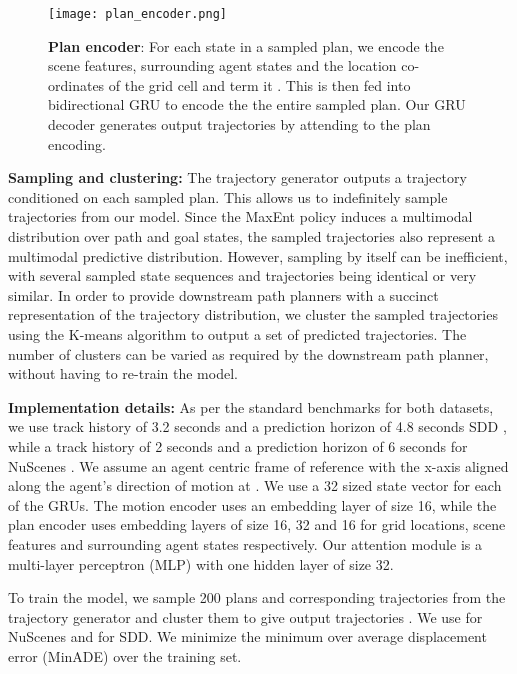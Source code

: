 \documentclass[journal]{IEEEtran}
\begin{document}
\begin{figure}[t]
\centering
\texttt{[image: plan\_encoder.png]}
\caption{\textbf{Plan encoder}: For each state in a sampled plan, we encode the scene features, surrounding agent states and the location co-ordinates of the grid cell and term it . This is then fed into bidirectional GRU to encode the the entire sampled plan. Our GRU decoder generates output trajectories by attending to the plan encoding.}
\label{fig:plan_encoder}
\end{figure}

\vspace{0.1in}
\noindent \textbf{Sampling and clustering:} The trajectory generator outputs a trajectory conditioned on each sampled plan. This allows us to indefinitely sample trajectories from our model. Since the MaxEnt policy induces a multimodal distribution over path and goal states, the sampled trajectories also represent a multimodal predictive distribution. However, sampling by itself can be inefficient, with several sampled state sequences and trajectories being identical or very similar. In order to provide downstream path planners with a succinct representation of the trajectory distribution, we cluster the sampled trajectories using the K-means algorithm to output a set of  predicted trajectories. The number of clusters  can be varied as required by the downstream path planner, without having to re-train the model.   



\vspace{0.1in}
\noindent\textbf{Implementation details:} As per the standard benchmarks for both datasets, we use track history of 3.2 seconds and a prediction horizon of 4.8 seconds SDD \cite{robicquet2016learning}, while a track history of 2 seconds and a prediction horizon of 6 seconds for NuScenes \cite{caesar2020nuscenes}. We assume an agent centric frame of reference with the x-axis aligned along the agent's direction of motion at . We use a 32 sized state vector for each of the GRUs. The motion encoder uses an embedding layer of size 16, while the plan encoder uses embedding layers of size 16, 32 and 16 for grid locations, scene features and surrounding agent states respectively. Our attention module is a multi-layer perceptron (MLP) with one hidden layer of size 32. 

To train the model, we sample 200 plans and corresponding trajectories from the trajectory generator and cluster them to give  output trajectories . We use  for NuScenes and  for SDD. We minimize the minimum over  average displacement error (MinADE) over the training set.
\end{document}
